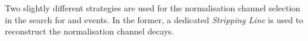 



%

              








Two slightly different strategies are used for the normalisation channel selection in the search for \decay{\Bp}{\Dsp\phiz} and \decay{\Bp}{\Dsp\Kp\Km} events.
In the former, a dedicated \decay{\Bp}{\Dsp\Dzb} \emph{Stripping Line} is used to reconstruct the normalisation channel decays.

%    

